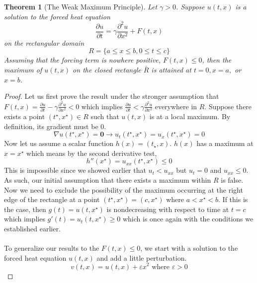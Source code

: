 \documentclass{article}
\newcommand{\pd}[2]{\frac{\partial #1}{\partial #2}}
\newcommand{\pdt}[2]{\frac{\partial ^2 #1}{\partial #2 ^2}}
\newcommand{\vb}[1]{\mathbf{ #1}}
\newtheorem{theorem}{Theorem}[section]
\numberwithin{equation}{section}
\begin{document}
\begin{theorem}[The Weak Maximum Principle]
    Let $\gamma >0$. Suppose $u(t,x)$ is a solution to the forced heat equation 
    \begin{equation*}
        \pd{u}{t} = \gamma \pdt{u}{x} + F(t,x)
    \end{equation*}
    on the rectangular domain 
    \begin{equation*}
        R=\{a\leq x \leq b, 0 \leq t \leq c \}
    \end{equation*}
    Assuming that the forcing term is nowhere positive, $F(t,x) \leq 0$, then the maximum of $u(t,x)$ on the closed rectangle $\bar{R}$ is attained at $t=0, x=a,$ or $x=b$.
\end{theorem}
\begin{proof}
    Let us first prove the result under the stronger assumption that $F(t,x) = \pd{u}{t} -\gamma \pdt{u}{x} <0$ which implies $\pd{u}{t} < \gamma \pdt{u}{x}$ everywhere in $R$. Suppose there exists a point $(t^\star, x^\star) \in R$ such that $u(t,x)$ is at a local maximum. By definition, its gradient must be 0.
    \begin{equation*}
        \nabla u(t^\star, x^\star ) = \vb{0} \rightarrow u_t(t^\star,x^\star) = u_{x}(t^\star, x^\star) = 0
    \end{equation*}
    Now let us assume a scalar function $h(x) = (t_\star, x)$. $h(x)$ has a maximum at $x=x^\star$ which means by the second derivative test,
    \begin{equation*}
        h''(x^\star) = u_{xx}(t^\star, x^\star) \leq 0
    \end{equation*}
    This is impossible since we showed earlier that $u_t < u_{xx}$ but $u_t = 0$ and $u_{xx} \leq 0$. As such, our initial assumption that there exists a maximum within $R$ is false. Now we need to exclude the possibility of the maximum occurring at the right edge of the rectangle at a point $(t^\star,x^\star) = (c,x^\star)$ where $a<x^\star < b$. If this is the case, then $g(t) =u(t,x^\star)$ is nondecreasing with respect to time at $t=c$ which implies $g'(t) = u_t(t,x^\star) \geq 0$ which is once again with the conditions we established earlier. \\\\
    To generalize our results to the $F(t,x) \leq 0$, we start with a solution to the forced heat equation $u(t,x)$ and add a little perturbation.
    \begin{equation*}
        v(t,x) = u(t,x) + \varepsilon x^2 \text{ where } \varepsilon>0
    \end{equation*}

\end{proof}
\end{document}
